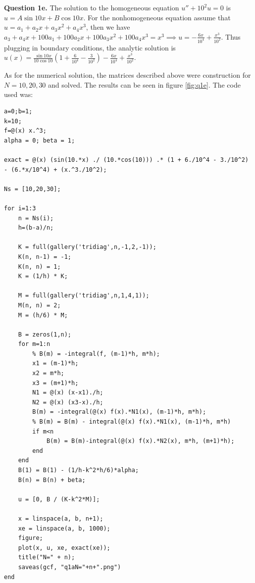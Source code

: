 \documentclass[letterpaper, reqno,11pt]{article}
\begin{document}
{\medskip\noindent\bf Question 1e.} The solution to the homogeneous equation $u''+10^2u=0$ is $u=A\sin 10x+B\cos 10x$. For the nonhomogeneous equation assume that $u=a_1+a_2x+a_3x^2+a_4x^{3}$, then we have $a_3+a_4x+100a_1+100a_2x+100a_3x^2+100a_4x^{3}=x^{3}\implies u=-\frac{6x}{10^{4}}+\frac{x^{3}}{10^2}$. Thus plugging in boundary conditions, the analytic solution is $u(x)=\frac{\sin 10x}{10\cos 10}\left(1+\frac{6}{10^{4}}-\frac{3}{10^2}\right)-\frac{6x}{10^{4}}+\frac{x^{3}}{10^2}$.

As for the numerical solution, the matrices described above were construction for $N=10,20,30$ and solved. The results can be seen in figure \ref{fig:q1e}. The code used was:

\begin{lstlisting}
a=0;b=1;
k=10;
f=@(x) x.^3;
alpha = 0; beta = 1;

exact = @(x) (sin(10.*x) ./ (10.*cos(10))) .* (1 + 6./10^4 - 3./10^2) - (6.*x/10^4) + (x.^3./10^2);

Ns = [10,20,30];

for i=1:3
    n = Ns(i);
    h=(b-a)/n;

    K = full(gallery('tridiag',n,-1,2,-1));
    K(n, n-1) = -1;
    K(n, n) = 1;
    K = (1/h) * K;

    M = full(gallery('tridiag',n,1,4,1));
    M(n, n) = 2;
    M = (h/6) * M;

    B = zeros(1,n);
    for m=1:n
        % B(m) = -integral(f, (m-1)*h, m*h);
        x1 = (m-1)*h;
        x2 = m*h;
        x3 = (m+1)*h;
        N1 = @(x) (x-x1)./h;
        N2 = @(x) (x3-x)./h;
        B(m) = -integral(@(x) f(x).*N1(x), (m-1)*h, m*h);
        % B(m) = B(m) - integral(@(x) f(x).*N1(x), (m-1)*h, m*h)
        if m<n
            B(m) = B(m)-integral(@(x) f(x).*N2(x), m*h, (m+1)*h);
        end
    end
    B(1) = B(1) - (1/h-k^2*h/6)*alpha;
    B(n) = B(n) + beta;

    u = [0, B / (K-k^2*M)];

    x = linspace(a, b, n+1);
    xe = linspace(a, b, 1000);
    figure;
    plot(x, u, xe, exact(xe));
    title("N=" + n);
    saveas(gcf, "q1aN="+n+".png")
end
\end{lstlisting}
\end{document}
